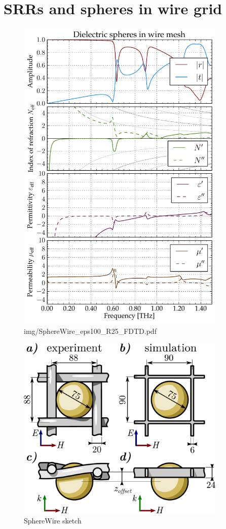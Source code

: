 \section{SRRs and spheres in wire grid} %
\begin{figure} \caption{img/SphereWire\_eps100\_R25\_FDTD.pdf}  \centering  \includegraphics[width=10cm]{img/SphereWire_eps100_R25_FDTD.pdf} \end{figure} \clearpage
\begin{figure} \caption{SphereWire sketch}  \centering  \includegraphics[width=10cm]{img/SphereWire_sketch.pdf} \end{figure} \clearpage
